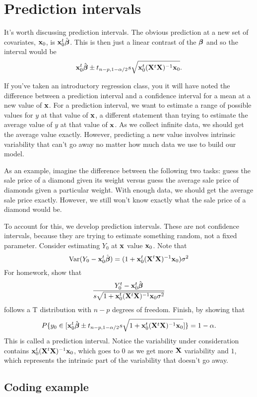 \section{Prediction intervals}

It's worth discussing prediction intervals. The obvious prediction
at a new set of covariates, $\mathbf{x}_0$, is $\mathbf{x}_0^t \hat {\boldsymbol{\beta}}$. This is 
then just a linear contrast of the $\boldsymbol{\beta}$ and so the interval would be
$$
\mathbf{x}_0^t \hat {\boldsymbol{\beta}}
\pm t_{n-p, 1-\alpha/2} s \sqrt{\mathbf{x}_0^t (\mathbf{X}^t \mathbf{X})^{-1} \mathbf{x}_0}.
$$

If you've taken an introductory regression class, you it will have noted
the difference between a prediction interval and a confidence interval
for a mean at a new value of $\mathbf{x}$. For a prediction interval, we
want to estimate a range of possible values for $y$ at that value
of $\mathbf{x}$, a different statement than trying to estimate the average
value of $y$ at that value of $\mathbf{x}$. As we collect infinite data,
we should get the average value exactly. However, predicting a new
value involves intrinsic variability that can't go away no matter
how much data we use to build our model. 

As an example, imagine the difference between the following two tasks:
guess the sale price of a diamond given its weight
versus guess the average sale price of diamonds 
given a particular weight. With enough data, we should get the average
sale price exactly. However, we still won't know exactly what the sale
price of a diamond would be. 

To account for this, we develop prediction intervals. These
are not confidence intervals, because they are trying to estimate
something random, not a fixed parameter. 
Consider estimating $Y_0$ at $\mathbf{x}$ value $\mathbf{x}_0$. 
Note that
$$
\mbox{Var}(Y_0 - \mathbf{x}_0^t \hat {\boldsymbol{\beta}}) = (1 + \mathbf{x}_0^t (\mathbf{X}^t \mathbf{X})^{-1} \mathbf{x}_0)\sigma^2
$$
For homework,
show that 
$$
\frac{Y_0^t - \mathbf{x}_0^t \hat {\boldsymbol{\beta}}}{s\sqrt{1 + \mathbf{x}_0^t (\mathbf{X}^t \mathbf{X})^{-1} \mathbf{x}_0 \sigma^2}}
$$
follows a T distribution with $n-p$ degrees of freedom. Finish, by showing that
$$
P\{y_0 \in [\mathbf{x}_0^t \hat {\boldsymbol{\beta}}
\pm t_{n-p, 1-\alpha/2} s \sqrt{1 + \mathbf{x}_0^t (\mathbf{X}^t \mathbf{X})^{-1} \mathbf{x}_0}]\} = 1 - \alpha.
$$
This is called a prediction interval. Notice the variability under consideration
contains $\mathbf{x}_0^t (\mathbf{X}^t \mathbf{X})^{-1} \mathbf{x}_0$, which goes to 0 as we get more $\mathbf{X}$ variability
and $1$, which represents the intrinsic part of the variability that doesn't
go away.


\subsection{Coding example}

